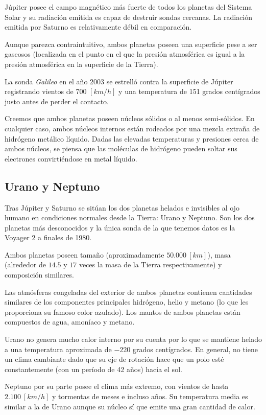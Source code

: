 \documentclass{tufte-handout}
\begin{document}
Júpiter posee el campo magnético más fuerte de todos los planetas del Sistema Solar y su radiación emitida es capaz de destruir sondas cercanas. La radiación emitida por Saturno es relativamente débil en comparación.

Aunque parezca contraintuitivo, ambos planetas poseen una superficie pese a ser gaseosos (localizada en el punto en el que la presión atmosférica es igual a la presión atmosférica en la superficie de la Tierra).

La sonda \emph{Galileo} en el año 2003 se estrelló contra la superficie de Júpiter registrando vientos de 700 $[km/h]$ y una temperatura de 151 grados centígrados justo antes de perder el contacto.

Creemos que ambos planetas poseen núcleos sólidos o al menos semi-sólidos. En cualquier caso, ambos núcleos internos están rodeados por una mezcla extraña de hidrógeno metálico líquido. Dadas las elevadas temperaturas y presiones cerca de ambos núcleos, se piensa que las moléculas de hidrógeno pueden soltar sus electrones convirtiéndose en metal líquido.

\subsection{Urano y Neptuno}

Tras Júpiter y Saturno se sitúan los dos planetas helados e invisibles al ojo humano en condiciones normales desde la Tierra: Urano y Neptuno. Son los dos planetas más desconocidos y la única sonda de la que tenemos datos es la Voyager 2 a finales de 1980.

Ambos planetas poseen tamaño (aproximadamente $50.000~[km]$), masa (alrededor de $14.5$ y $17$ veces la masa de la Tierra respectivamente) y composición similares.

Las atmósferas congeladas del exterior de ambos planetas contienen cantidades similares de los componentes principales hidrógeno, helio y metano (lo que les proporciona su famoso color azulado). Los mantos de ambos planetas están compuestos de agua, amoníaco y metano.

Urano no genera mucho calor interno por su cuenta por lo que se mantiene helado a una temperatura aproximada de $-220$ grados centígrados. En general, no tiene un clima cambiante dado que su eje de rotación hace que un polo esté constantemente (con un período de 42 años) hacia el sol.

Neptuno por su parte posee el clima más extremo, con vientos de hasta $2.100~[km/h]$ y tormentas de meses e incluso años. Su temperatura media es similar a la de Urano aunque su núcleo sí que emite una gran cantidad de calor.
\end{document}
